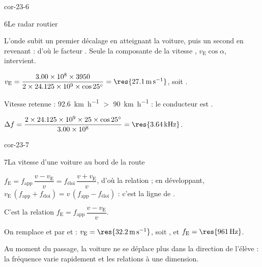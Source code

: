 \begin{blocLivre}{cor-23-6}
\begin{corrige}{6}{Le radar routier}
\begin{questions}
\item L'onde subit un premier décalage en atteignant la voiture, puis un second en revenant : d'où le facteur
. Seule la composante de la vitesse , $v_\mathrm{E}\cos\alpha$, intervient.
\item $v_\mathrm{E}=\dfrac{\num{3.00e8}\times3950}{2\times\num{24.125e9}\times\cos25^\circ}=\res{\qty{27,1}{m.s^{-1}}}$, soit .
\item Vitesse retenue : \qty{92,6}{km.h^{-1}} $>$ \qty{90}{km.h^{-1}} : le conducteur est .
\item $\Delta f=\dfrac{2\times\num{24.125e9}\times25\times\cos25^\circ}{\num{3.00e8}}=\res{\qty{3,64}{kHz}}$.
\end{questions}
\end{corrige}
\end{blocLivre}
\begin{blocLivre}{cor-23-7}
\begin{corrige}{7}{La vitesse d'une voiture au bord de la route}
\begin{questions}
\item $f_\mathrm{E}=f_\text{app}\,\dfrac{v-v_\mathrm{E}}{v}=f_\text{éloi}\,\dfrac{v+v_\mathrm{E}}{v}$, d'où la relation ; en développant,
$v_\mathrm{E}\,(f_\text{app}+f_\text{éloi})=v\,(f_\text{app}-f_\text{éloi})$ : c'est la ligne de .
\item C'est la relation $f_\mathrm{E}=f_\text{app}\,\dfrac{v-v_\mathrm{E}}{v}$.
\item On remplace  et  par  et  : $v_\mathrm{E}=\res{\qty{32,2}{m.s^{-1}}}$, soit
, et $f_\mathrm{E}=\res{\qty{961}{Hz}}$.
\item Au moment du passage, la voiture ne se déplace plus dans la direction de l'élève : la fréquence varie
rapidement et  les relations à une dimension.
\end{questions}
\end{corrige}
\end{blocLivre}
